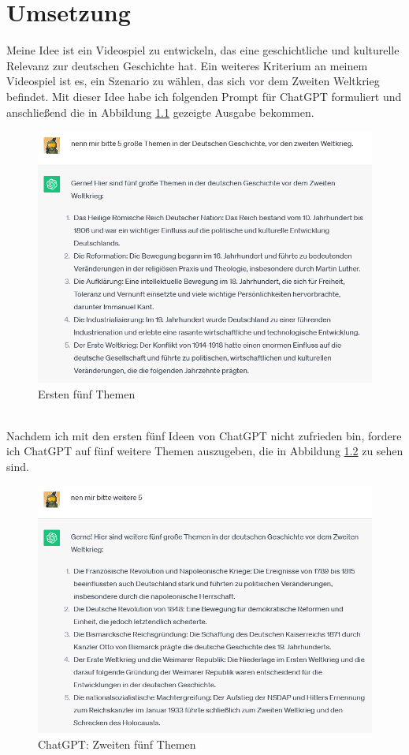 \chapter{Umsetzung}
Meine Idee ist ein Videospiel zu entwickeln, das eine geschichtliche und kulturelle Relevanz zur deutschen Geschichte hat. Ein weiteres Kriterium an meinem Videospiel ist es, ein Szenario zu wählen, das sich vor dem Zweiten Weltkrieg befindet. Mit dieser Idee habe ich folgenden Prompt für ChatGPT formuliert und anschließend die in Abbildung \ref{ersten-5-themen} gezeigte Ausgabe bekommen.
\begin{figure}[h]
	\centering
	\includegraphics[width=14cm]{BilderFuerBA/thema01.png}
	\caption{Ersten fünf Themen}
	\label{ersten-5-themen}
\end{figure}
\\
Nachdem ich mit den ersten fünf Ideen von ChatGPT nicht zufrieden bin, fordere ich ChatGPT auf fünf weitere Themen auszugeben, die in Abbildung \ref{zweiten-5-themen} zu sehen sind.
\begin{figure}[h]
	\centering
	\includegraphics[width=14cm]{BilderFuerBA/thema02.png}
	\caption{ChatGPT: Zweiten fünf Themen}
	\label{zweiten-5-themen}
\end{figure}
